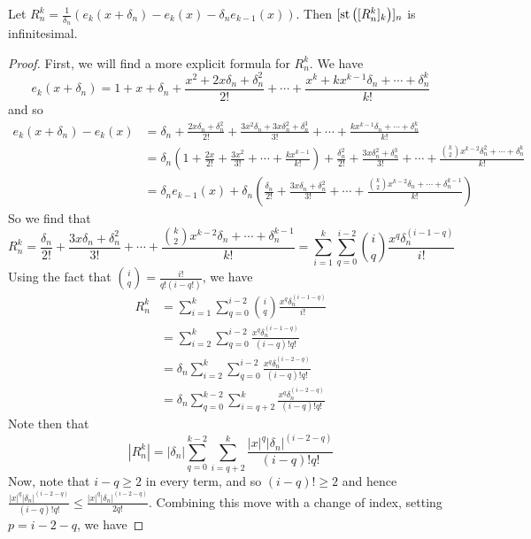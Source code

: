 \begin{lemma}\label{expDerivProofLemma}
    Let $R_n^k = \frac{1}{\delta_n}(e_k(x + \delta_n) - e_k(x) - \delta_n e_{k-1}(x))$. Then $[\operatorname{st}\left([R_n^k]_k\right)]_n$ is infinitesimal.
\end{lemma}

\begin{proof}
    First, we will find a more explicit formula for $R_n^k$. We have
    \[e_k(x + \delta_n) = 1 + x + \delta_n + \frac{x^2 + 2x\delta_n + \delta_n^2}{2!} + \cdots + \frac{x^k + kx^{k-1}\delta_n + \cdots + \delta_n^k}{k!} \]
    and so
    \begin{align*}
    e_k(x + \delta_n) - e_k(x) &= \delta_n + \frac{2x\delta_n + \delta_n^2}{2!} + \frac{3x^2\delta_n + 3x\delta_n^2 + \delta_n^3}{3!} + \cdots + \frac{kx^{k-1}\delta_n + \cdots + \delta_n^k}{k!} \\
        &= \delta_n\left(1 + \frac{2x}{2!} + \frac{3x^2}{3!} + \cdots + \frac{kx^{k-1}}{k!}\right) + \frac{\delta_n^2}{2!} + \frac{3x\delta_n^2 + \delta_n^3}{3!} + \cdots + \frac{\binom{k}{2} x^{k-2}\delta_n^2 + \cdots + \delta_n^k}{k!} \\
        &= \delta_n e_{k-1}(x) + \delta_n\left(\frac{\delta_n}{2!} + \frac{3x\delta_n + \delta_n^2}{3!} + \cdots + \frac{\binom{k}{2} x^{k-2}\delta_n + \cdots + \delta_n^{k-1}}{k!}\right)
    \end{align*}
    So we find that 
    \[R_n^k = \frac{\delta_n}{2!} + \frac{3x\delta_n + \delta_n^2}{3!} + \cdots + \frac{\binom{k}{2} x^{k-2}\delta_n + \cdots + \delta_n^{k-1}}{k!} = \sum_{i=1}^k \sum_{q=0}^{i-2} \binom{i}{q} \frac{x^q \delta_n^{(i-1-q)}}{i!}\]
    Using the fact that $\binom{i}{q} = \frac{i!}{q!(i-q!)}$, we have
    \begin{align*}
    R_n^k &= \sum_{i=1}^k \sum_{q=0}^{i-2} \binom{i}{q} \frac{x^q \delta_n^{(i-1-q)}}{i!} \\
        &= \sum_{i=2}^k \sum_{q=0}^{i-2}\frac{x^q\delta_n^{(i-1-q)}}{(i-q)!q!} \\
        &= \delta_n \sum_{i=2}^k \sum_{q=0}^{i-2} \frac{x^{q}\delta_n^{(i-2-q)}}{(i-q)!q!} \\
        &= \delta_n \sum_{q=0}^{k-2}\sum_{i=q+2}^k \frac{x^{q}\delta_n^{(i-2-q)}}{(i-q)!q!}
    \end{align*}
    Note then that
    \[ |R_n^k| = |\delta_n| \sum_{q=0}^{k-2}\sum_{i=q+2}^k \frac{|x|^q |\delta_n|^{(i-2-q)}}{(i-q)!q!} \]
    Now, note that $i - q \geq 2$ in every term, and so $(i-q)! \geq 2$ and hence $\frac{|x|^q |\delta_n|^{(i-2-q)}}{(i-q)!q!} \leq \frac{|x|^q |\delta_n|^{(i-2-q)}}{2q!}$. Combining this move with a change of index, setting $p = i - 2 - q$, we have

\end{proof}
